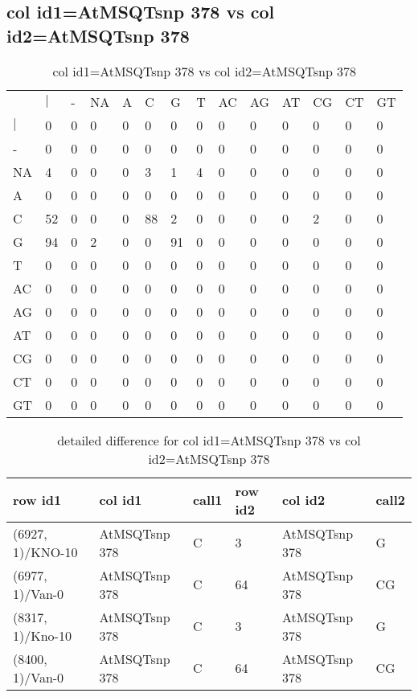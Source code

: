 \subsection{col id1=AtMSQTsnp 378 vs col id2=AtMSQTsnp 378}
\begin{center}
\begin{longtable}{|l|l|l|l|l|l|l|l|l|l|l|l|l|l|}
\caption{col id1=AtMSQTsnp 378 vs col id2=AtMSQTsnp 378} \label{table_dm894}\\
\hline
\\
\hline
&$|$&-&NA&A&C&G&T&AC&AG&AT&CG&CT&GT\\
$|$&0&0&0&0&0&0&0&0&0&0&0&0&0\\
-&0&0&0&0&0&0&0&0&0&0&0&0&0\\
NA&4&0&0&0&3&1&4&0&0&0&0&0&0\\
A&0&0&0&0&0&0&0&0&0&0&0&0&0\\
C&52&0&0&0&88&2&0&0&0&0&2&0&0\\
G&94&0&2&0&0&91&0&0&0&0&0&0&0\\
T&0&0&0&0&0&0&0&0&0&0&0&0&0\\
AC&0&0&0&0&0&0&0&0&0&0&0&0&0\\
AG&0&0&0&0&0&0&0&0&0&0&0&0&0\\
AT&0&0&0&0&0&0&0&0&0&0&0&0&0\\
CG&0&0&0&0&0&0&0&0&0&0&0&0&0\\
CT&0&0&0&0&0&0&0&0&0&0&0&0&0\\
GT&0&0&0&0&0&0&0&0&0&0&0&0&0\\
\hline
\end{longtable}
\end{center}

\begin{center}
\begin{longtable}{|l|l|l|l|l|l|}
\caption{detailed difference for col id1=AtMSQTsnp 378 vs col id2=AtMSQTsnp 378} \label{table_dm895}\\
\hline
row id1&col id1&call1&row id2&col id2&call2\\
\hline
(6927, 1)/KNO-10&AtMSQTsnp 378&C&3&AtMSQTsnp 378&G\\
(6977, 1)/Van-0&AtMSQTsnp 378&C&64&AtMSQTsnp 378&CG\\
(8317, 1)/Kno-10&AtMSQTsnp 378&C&3&AtMSQTsnp 378&G\\
(8400, 1)/Van-0&AtMSQTsnp 378&C&64&AtMSQTsnp 378&CG\\
\hline
\end{longtable}
\end{center}

